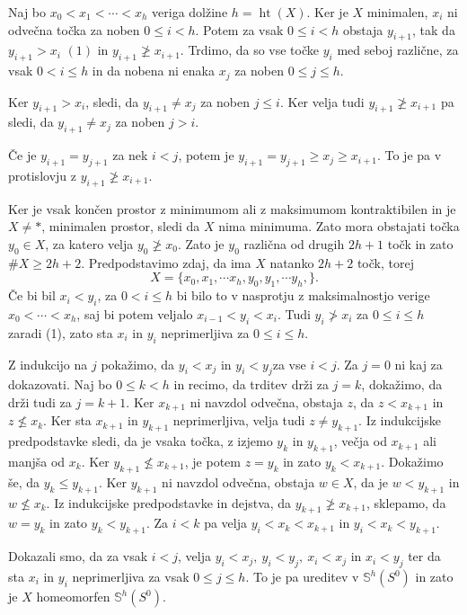 \documentclass[mat1]{fmfdelo}
\DeclareMathOperator*{\htt}{ht}
\newcommand{\Sus}{\mathbb S}
\begin{document}
  \begin{dokaz}
      Naj bo $x_0<x_1 <\cdots <x_h$ veriga dolžine $h=\htt(X)$. Ker je $X$
       minimalen, $x_i$ ni odvečna točka za noben $0\leq i <h$. Potem za 
       vsak $0\leq i <h$ obstaja $y_{i+1}$, tak da $y_{i+1}> x_i$ $(1)$ in $y_{i+1}
       \ngeq x_{i+1}$. Trdimo, da so vse točke $y_i$ med seboj različne, za vsak
        $0< i \leq h$ in da nobena ni enaka $x_j$ za noben $0\leq j \leq h$.
  
        Ker $y_{i+1} > x_i$, sledi, da $y_{i+1}\neq x_j$ za noben $j\leq i$. Ker velja tudi $y_{i+1}\ngeq x_{i+1}$ pa sledi, da $y_{i+1}\neq x_j$ za 
        noben $j> i$.
  
        Če je $y_{i+1}= y_{j+1}$ za nek $i<j$, potem je $y_{i+1}= y_{j+1}\geq
         x_j \geq x_{i+1}$. To je pa v protislovju z $y_{i+1} 
         \ngeq x_{i+1}$.
  
         Ker je vsak končen prostor z minimumom ali z maksimumom kontraktibilen 
         in je $X\neq \ast$, minimalen prostor, sledi da $X$ nima minimuma. Zato mora obstajati točka $y_0\in X$, za katero velja $y_0 \ngeq x_0$.
          Zato je $y_0$ različna od drugih $2h+1$ točk in zato $\# X\geq 2h+2$.
          Predpodstavimo zdaj, da ima $X$ natanko $2h+2$ točk, torej 
          $$
          X=\{x_0,x_1,\cdots x_h,y_0,y_1,\cdots y_h,\}.
          $$
          Če bi bil $x_i < y_i$, za $0<i\leq h$ bi bilo to v nasprotju z 
          maksimalnostjo verige $x_0 <\cdots <x_h$, saj bi potem veljalo $x_{i-1} 
          < y_i < x_i$. Tudi $y_i \ngtr x_i$ za $0\leq i \leq h$ zaradi (1), zato sta $x_i $ in $y_i$ neprimerljiva za $0\leq i \leq h$.
  
          Z indukcijo na $j$ pokažimo, da $y_i < x_j$ in $y_i < y_j$za vse $i<j$. Za $j=0$ 
          ni kaj za dokazovati. Naj bo $0\leq k <h$ in recimo, da trditev drži za $j=k$, 
          dokažimo, da drži tudi za $j=k+1$. Ker $x_{k+1}$ ni navzdol odvečna, 
          obstaja $z$, da $z< x_{k+1}$ in $z\nleq x_k$. Ker sta $x_{k+1}$ in 
          $y_{k+1}$ neprimerljiva, velja tudi $z\neq y_{k+1}$. Iz indukcijske 
          predpodstavke sledi, da je vsaka točka, z izjemo $y_k$ in $y_{k+1}$, večja 
          od $x_{k+1}$ ali manjša od $x_k$. Ker $y_{k+1} \nleq x_{k+1}$, je potem
          $z=y_k$ in zato $y_k<x_{k+1}$. Dokažimo še, da $y_k\leq y_{k+1}$. Ker 
          $y_{k+1}$ ni navzdol odvečna, obstaja $w\in X$, da je $w<y_{k+1}$ in 
          $w\nleq x_k$. Iz indukcijske predpodstavke
           in dejstva, da $y_{k+1}\ngeq x_{k+1}$, sklepamo,
          da $w=y_k$ in zato $y_k<y_{k+1}$. Za $i<k$ pa velja $y_i<x_k<x_{k+1}$ in
          $y_i<x_k<y_{k+1}$.
  
          Dokazali smo, da za vsak $i<j$,  velja $y_i < x_j,\ y_i < y_j,\ x_i < x_j$ in
$x_i < y_j$ ter da sta $x_i$ in $y_i$ neprimerljiva za vsak $0\leq j \leq h$.
To je pa ureditev v $\Sus^h(S^0)$ in zato je $X$ homeomorfen 
    $\Sus^h(S^0)$.
  
\end{dokaz}
\end{document}
